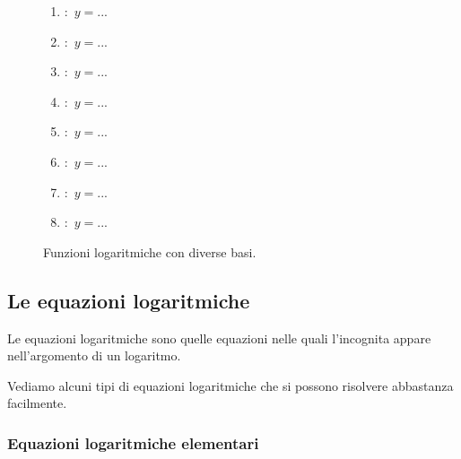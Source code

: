 \begin{figure}[!h]
\begin{minipage}{.58\textwidth}
 \begin{enumerate} [label=\alph*]
   \item :~$y=...$ \vspace{12pt}
   \item :~$y=...$ \vspace{12pt}
   \item :~$y=...$ \vspace{12pt}
   \item :~$y=...$ \vspace{12pt}
   \item :~$y=...$ \vspace{12pt}
   \item :~$y=...$ \vspace{12pt}
   \item :~$y=...$ \vspace{12pt}
   \item :~$y=...$ \vspace{12pt}
 \end{enumerate}
\end{minipage}
\hspace{12pt}
\begin{minipage}{.40\textwidth}
 \begin{inaccessibleblock}
  \logdiversebasi
\end{inaccessibleblock}
\end{minipage}
  \caption{Funzioni logaritmiche con diverse basi.} \label{fig:log_diversebasi}
\end{figure}

\subsection{Le equazioni logaritmiche}
\label{subsec:esplog_equazionilogaritmiche}

\begin{definizione}{
Le equazioni logaritmiche sono quelle equazioni nelle quali l'incognita appare 
nell'argomento di un logaritmo.
}
\end{definizione}

Vediamo alcuni tipi di equazioni logaritmiche che si possono risolvere 
abbastanza facilmente.

\subsubsection{Equazioni logaritmiche elementari}
\label{subsubsec:esplog_eq_log_elementari}

